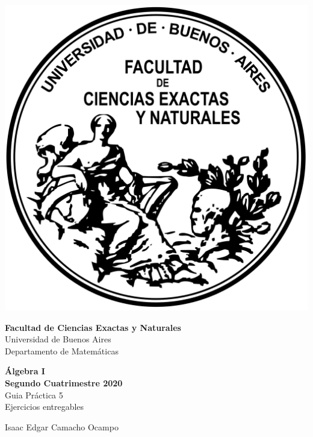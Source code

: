 \documentclass[12pt]{book}
\begin{document}
\thispagestyle{empty}

\begin {center}

\includegraphics[scale=.4]{Logo-fcenuba.png}

\medskip
\textbf{Facultad de Ciencias Exactas y Naturales}
\\
Universidad de Buenos Aires
\\
Departamento de Matemáticas

\vspace{3cm}


\textbf{\large Álgebra I}\\
\textbf{Segundo Cuatrimestre 2020}
\\    Guia Pr\'actica 5
\\ Ejercicios entregables
\vspace{2cm}




\end {center}


\vspace{2.5cm}

\noindent Isaac Edgar Camacho Ocampo
 

\vspace{1cm}

\vspace{1cm}
\end{document}
